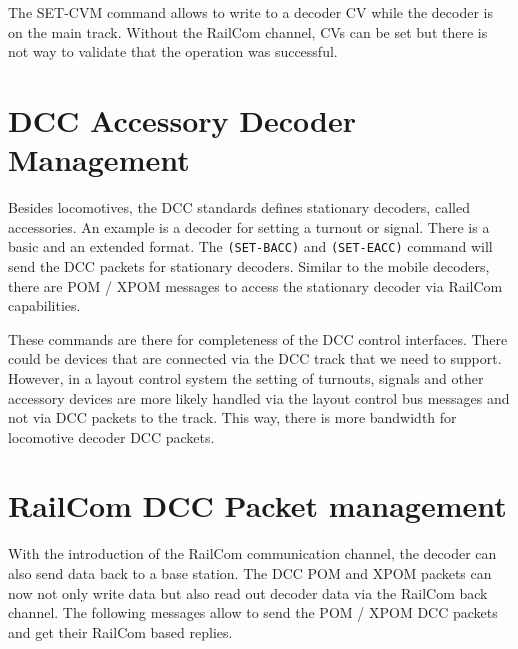 The SET-CVM command allows to write to a decoder CV while the decoder is on the main track. Without the RailCom channel, CVs can be set but there is not way to validate that the operation was successful.

\section{DCC Accessory Decoder Management}

Besides locomotives, the DCC standards defines stationary decoders, called accessories. An example is a decoder for setting a turnout or signal. There is a basic and an extended format. The \texttt{(SET-BACC)} and \texttt{(SET-EACC)} command will send the DCC packets for stationary decoders. Similar to the mobile decoders, there are POM / XPOM messages to access the stationary decoder via RailCom capabilities.

\begin{table}[ht!]
    \centering 
    \caption{DCC Accessory Decoder Management}
\end{table}

These commands are there for completeness of the DCC control interfaces. There could be devices that are connected via the DCC track that we need to support. However, in a layout control system the setting of turnouts, signals and other accessory devices are more likely handled via the layout control bus messages and not via DCC packets to the track. This way, there is more bandwidth for locomotive decoder DCC packets.

\section{RailCom DCC Packet management}

With the introduction of the RailCom communication channel, the decoder can also send data back to a base station. The DCC POM and XPOM packets can now not only write data but also read out decoder data via the RailCom back channel. The following messages allow to send the POM / XPOM DCC packets and get their RailCom based replies.

